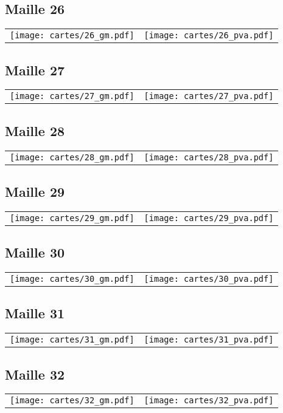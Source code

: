 \subsection{Maille 26}
\begin{tabular}{ll}
\texttt{[image: cartes/26\_gm.pdf]}
&
\texttt{[image: cartes/26\_pva.pdf]}
\end{tabular}
\newpage
\subsection{Maille 27}
\begin{tabular}{ll}
\texttt{[image: cartes/27\_gm.pdf]}
&
\texttt{[image: cartes/27\_pva.pdf]}
\end{tabular}
\newpage
\subsection{Maille 28}
\begin{tabular}{ll}
\texttt{[image: cartes/28\_gm.pdf]}
&
\texttt{[image: cartes/28\_pva.pdf]}
\end{tabular}
\newpage
\subsection{Maille 29}
\begin{tabular}{ll}
\texttt{[image: cartes/29\_gm.pdf]}
&
\texttt{[image: cartes/29\_pva.pdf]}
\end{tabular}
\newpage
\subsection{Maille 30}
\begin{tabular}{ll}
\texttt{[image: cartes/30\_gm.pdf]}
&
\texttt{[image: cartes/30\_pva.pdf]}
\end{tabular}
\newpage
\subsection{Maille 31}
\begin{tabular}{ll}
\texttt{[image: cartes/31\_gm.pdf]}
&
\texttt{[image: cartes/31\_pva.pdf]}
\end{tabular}
\newpage
\subsection{Maille 32}
\begin{tabular}{ll}
\texttt{[image: cartes/32\_gm.pdf]}
&
\texttt{[image: cartes/32\_pva.pdf]}
\end{tabular}
\newpage
